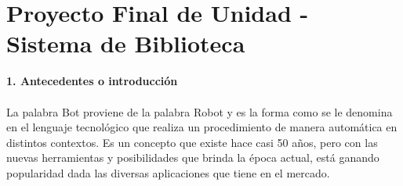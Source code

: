 \section{Proyecto Final de Unidad - Sistema de Biblioteca} 
\begin{flushleft}

\begin{itemize}
\textbf{1.	Antecedentes o introducción}\\
\textbf{ }\\

La palabra Bot proviene de la palabra Robot y es la forma como se le denomina en el lenguaje tecnológico que realiza un procedimiento de manera automática en distintos contextos.
Es un concepto que existe hace casi 50 años, pero con las nuevas herramientas y posibilidades que brinda la época actual, está ganando popularidad dada las diversas aplicaciones que tiene en el mercado.\textbf{ }\\
\textbf{ }\\


\end{itemize}
\end{flushleft}
